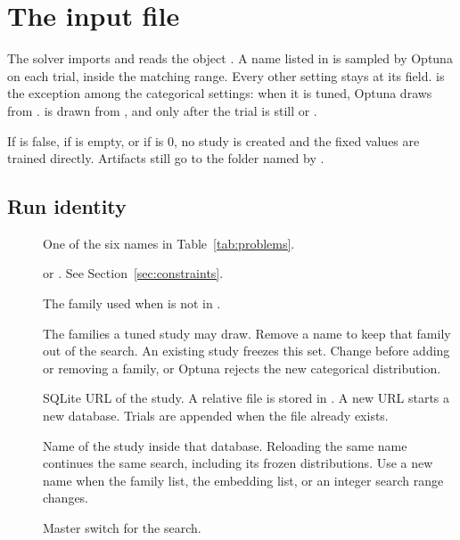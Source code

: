 \chapter{The input file}
\label{ch:config}

The solver imports  and reads the object .
A name listed in  is sampled by Optuna on each trial, inside the matching range.
Every other setting stays at its  field.
 is the exception among the categorical settings: when it is tuned, Optuna draws from .
 is drawn from , and only after the trial is still  or .

If  is false, if  is empty, or if  is 0, no study is created and the fixed values are trained directly.
Artifacts still go to the folder named by .

\section{Run identity}

\begin{description}
\item[]
One of the six names in Table~\ref{tab:problems}.

\item[]
 or . See Section~\ref{sec:constraints}.

\item[]
The family used when  is not in .

\item[]
The families a tuned study may draw.
Remove a name to keep that family out of the search.
An existing study freezes this set.
Change  before adding or removing a family, or Optuna rejects the new categorical distribution.

\item[]
SQLite URL of the study.
A relative file is stored in .
A new URL starts a new database.
Trials are appended when the file already exists.

\item[]
Name of the study inside that database.
Reloading the same name continues the same search, including its frozen distributions.
Use a new name when the family list, the embedding list, or an integer search range changes.

\item[]
Master switch for the search.
\end{description}

